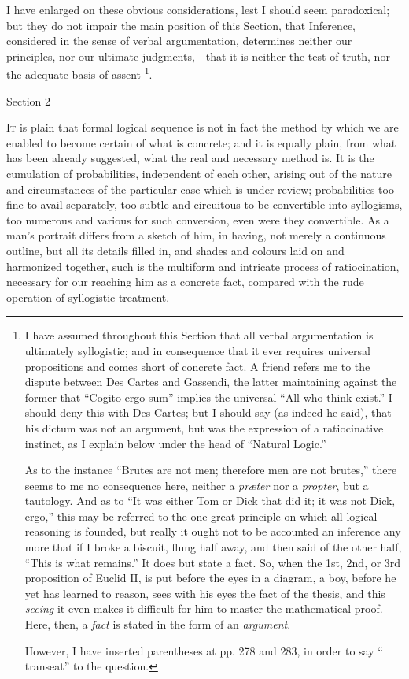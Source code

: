 I have enlarged on these obvious considerations, lest I should seem
paradoxical; but they do not impair the main position of this Section,
that Inference, considered in the sense of verbal argumentation,
determines neither our principles, nor our ultimate judgments,—that
it is neither the test of truth, nor the adequate basis of assent \footnote{I have assumed throughout this Section that all verbal
argumentation is ultimately syllogistic; and in consequence that it
ever requires universal propositions and comes short of concrete fact.
A friend refers me to the dispute between Des Cartes and Gassendi, the
latter maintaining against the former that ``Cogito ergo sum''
implies the universal ``All who think exist.'' I should deny
this with Des Cartes; but I should say (as indeed he said), that his
dictum was not an argument, but was the expression of a ratiocinative
instinct, as I explain below under the head of ``Natural
Logic.''

As to the instance ``Brutes are not men; therefore men are not
brutes,'' there seems to me no consequence here, neither a \emph{præter}
nor a \emph{propter}, but a tautology. And as to ``It was either
Tom or Dick that did it; it was not Dick, ergo,'' this may be
referred to the one great principle on which all logical reasoning is
founded, but really it ought not to be accounted an inference any more
that if I broke a biscuit, flung half away, and then said of the other
half, ``This is what remains.'' It does but state a fact. So,
when the 1st, 2nd, or 3rd proposition of Euclid II, is put before the
eyes in a diagram, a boy, before he yet has learned to reason, sees
with his eyes the fact of the thesis, and this \emph{seeing} it even makes it
difficult for him to master the mathematical proof. Here, then, a \emph{fact}
is stated in the form of an \emph{argument}.

However, I have inserted parentheses at pp. 278 and 283, in order
to say `` transeat'' to the question.}.

Section 2


I\textsc{t} is plain that formal logical sequence is not in fact the
method by which we are enabled to become certain of what is concrete;
and it is equally plain, from what has been already suggested, what
the real and necessary method is. It is the cumulation of
probabilities, independent of each other, arising out of the nature
and circumstances of the particular case which is under review;
probabilities too fine to avail separately, too subtle and circuitous
to be convertible into syllogisms, too numerous and various for such
conversion, even were they convertible. As a man's portrait differs
from a sketch of him, in having, not merely a continuous outline, but
all its details filled in, and shades and colours laid on and
harmonized together, such is the multiform and intricate process of
ratiocination, necessary for our reaching him as a concrete fact,
compared with the rude operation of syllogistic treatment.

